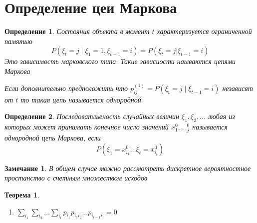 \documentclass[14pt]{extarticle}
\newtheorem{theorem}{Теорема}
\newtheorem{definition}{Определение}
\newtheorem{corollary}{Замечание}
\begin{document}
\section{Определение цеи Маркова}
\begin{definition}
	Состояния объекта в момент $t$ 
	характеризуется ограниченной памятью
	 \begin{equation}
		 P(\xi_{t} = j \mid \xi_{1} = 1 , \xi_{t-1} = i) = P(\xi_{t} = j | \xi_{t- 1} = i)
	\end{equation} 
	Это зависимость марковского типа. Такие зависиости наываются цепями Маркова

	Если дополнительно предположить что
	$p^{(1)}_{ij} = P(\xi_{t} = j \mid \xi_{t-1} =i)$ 
	независят от $t$ то такая цепь называется однородной
\end{definition}
\begin{definition}
	Последоватльеность случайных величин $\xi_{1},\xi_2,\dots$ любая из которых может принимать конечное число значений
	$x^{0}_{1},\dots_{j}^{0}$ называется однородной цепь Маркова, если
	\begin{equation}
	P(\xi_1 = x^{0}_{i_1} \dots \xi_{t} = x_{i_{t}}^{0}) 
	\end{equation} 
\end{definition}
\begin{corollary}
	В общем случае можно рассмотреть  дискретное вероятностное
	простанство с счетным множеством исходов
\end{corollary}
\begin{theorem}
	\begin{enumerate}
		\item  $\sum_{i_{1}} \sum_{i_2} \dots \sum_{i_{t}} p_{i_1} p_{i_1 i_2} \dots p_{i_{t-1}i_{t}} = 0$
	\end{enumerate}
\end{theorem}
\end{document}
